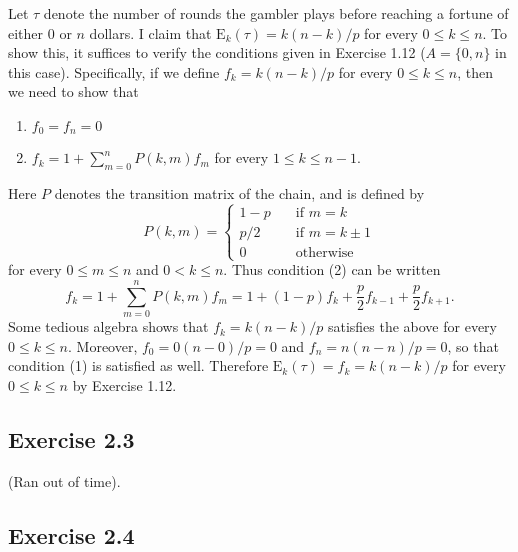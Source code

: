 \documentclass[12pt]{article}
\newcommand{\E}{\mathrm{E}}
\begin{document}
Let $\tau$ denote the number of rounds the gambler plays before reaching a fortune of either $0$ or $n$ dollars. I claim that $\E_k(\tau) = k(n-k)/p$ for every $0 \leq k \leq n$. To show this, it suffices to verify the conditions given in Exercise 1.12 ($A = \{0, n\}$ in this case). Specifically, if we define $f_k = k(n-k)/p$ for every $0 \leq k \leq n$, then we need to show that
\begin{enumerate}[label=(\arabic*)]
\item
$f_0 = f_n = 0$
\item
$f_k = 1 + \sum_{m=0}^n P(k, m) f_m$ for every $1 \leq k \leq n-1$.
\end{enumerate}
Here $P$ denotes the transition matrix of the chain, and is defined by
\begin{equation*}
P(k, m) = \begin{cases}
1-p & \quad \text{if $m=k$} \\
p/2 & \quad \text{if $m = k \pm 1$} \\
0 & \quad \text{otherwise}
\end{cases}
\end{equation*}
for every $0 \leq m \leq n$ and $0 < k \leq n$. Thus condition (2) can be written
\begin{equation*}
f_k = 1 + \sum_{m=0}^n P(k, m) f_m = 1 + (1-p)f_k + \frac{p}{2} f_{k-1} + \frac{p}{2} f_{k+1}.
\end{equation*}
Some tedious algebra shows that $f_k = k(n-k)/p$ satisfies the above for every $0 \leq k \leq n$. Moreover, $f_0 = 0(n-0)/p = 0$ and $f_n = n(n-n)/p = 0$, so that condition (1) is satisfied as well. Therefore $\E_k(\tau) = f_k = k(n-k)/p$ for every $0 \leq k \leq n$ by Exercise 1.12.

\subsection*{Exercise 2.3}

(Ran out of time).

\subsection*{Exercise 2.4}
\end{document}
